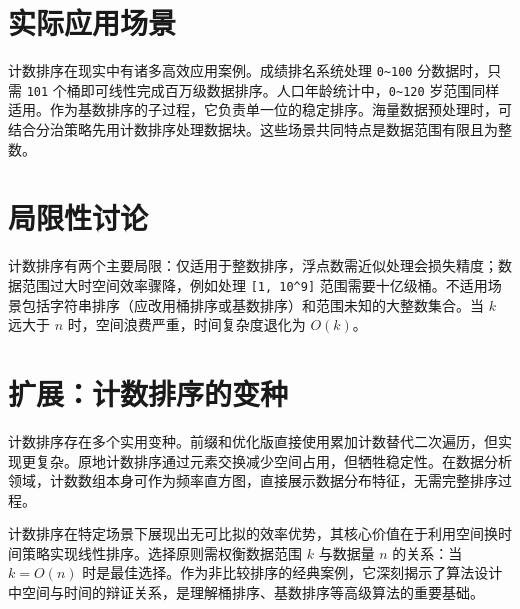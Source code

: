 \chapter{实际应用场景}
计数排序在现实中有诸多高效应用案例。成绩排名系统处理 \texttt{0\~{}100} 分数据时，只需 \texttt{101} 个桶即可线性完成百万级数据排序。人口年龄统计中，\texttt{0\~{}120} 岁范围同样适用。作为基数排序的子过程，它负责单一位的稳定排序。海量数据预处理时，可结合分治策略先用计数排序处理数据块。这些场景共同特点是数据范围有限且为整数。\par
\chapter{局限性讨论}
计数排序有两个主要局限：仅适用于整数排序，浮点数需近似处理会损失精度；数据范围过大时空间效率骤降，例如处理 \texttt{[1, 10\^{}9]} 范围需要十亿级桶。不适用场景包括字符串排序（应改用桶排序或基数排序）和范围未知的大整数集合。当 $k$ 远大于 $n$ 时，空间浪费严重，时间复杂度退化为 $O(k)$。\par
\chapter{扩展：计数排序的变种}
计数排序存在多个实用变种。前缀和优化版直接使用累加计数替代二次遍历，但实现更复杂。原地计数排序通过元素交换减少空间占用，但牺牲稳定性。在数据分析领域，计数数组本身可作为频率直方图，直接展示数据分布特征，无需完整排序过程。\par
计数排序在特定场景下展现出无可比拟的效率优势，其核心价值在于利用空间换时间策略实现线性排序。选择原则需权衡数据范围 $k$ 与数据量 $n$ 的关系：当 $k = O(n)$ 时是最佳选择。作为非比较排序的经典案例，它深刻揭示了算法设计中空间与时间的辩证关系，是理解桶排序、基数排序等高级算法的重要基础。\par
